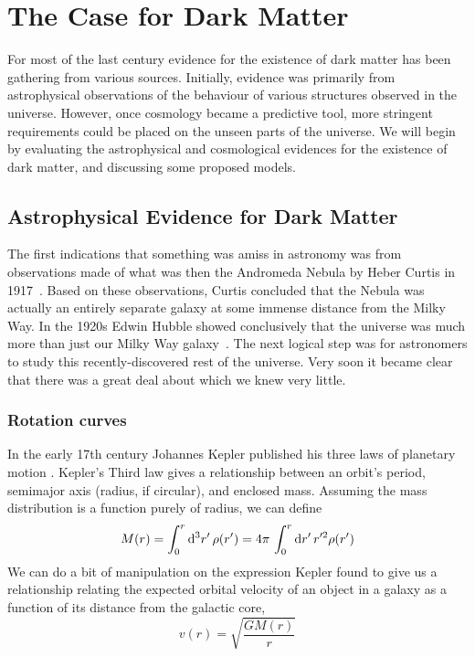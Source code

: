 
%

\chapter{The Case for Dark Matter}

For most of the last century evidence for the existence of dark matter has been gathering from various sources. Initially, evidence was primarily from astrophysical observations of the behaviour of various structures observed in the universe. However, once cosmology became a predictive tool, more stringent requirements could be placed on the unseen parts of the universe. We will begin by evaluating the astrophysical and cosmological evidences for the existence of dark matter, and discussing some proposed models.

\section{Astrophysical Evidence for Dark Matter}

The first indications that something was amiss in astronomy was from observations made of what was then the Andromeda Nebula by Heber Curtis in 1917~\cite{}. Based on these observations, Curtis concluded that the Nebula was actually an entirely separate galaxy at some immense distance from the Milky Way. In the 1920s Edwin Hubble showed conclusively that the universe was much more than just our Milky Way galaxy~\cite{Hubble:1929}. The next logical step was for astronomers to study this recently-discovered rest of the universe. Very soon it became clear that there was a great deal about which we knew very little.

\subsection{Rotation curves}

In the early 17th century Johannes Kepler published his three laws of planetary motion \cite{Kepler}. Kepler's Third law gives a relationship between an orbit's period, semimajor axis (radius, if circular), and enclosed mass. Assuming the mass distribution is a function purely of radius, we can define
\begin{equation} \label{eq:mass_distribution}
M(r) = \int_0^r \mathrm{d}^3r'\, \rho (r') = 4\pi\,\int_0^r \mathrm{d}r'\, r'^{2} \rho(r')
\end{equation}
We can do a bit of manipulation on the expression Kepler found to give us a relationship relating the expected orbital velocity of an object in a galaxy as a function of its distance from the galactic core,
\begin{equation} \label{eq:rotation_curve}
v(r) = \sqrt{\frac{GM(r)}{r}}
\end{equation}

